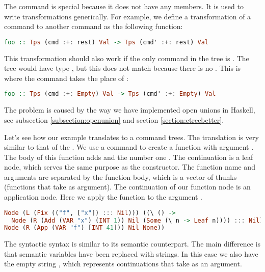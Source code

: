 The  command is special because it does not have any members. It is used to write transformations generically. For example, we define a transformation of a command to another command as the following function:

\begin{lstlisting}[language=Haskell]
foo :: Tps (cmd :+: rest) Val -> Tps (cmd' :+: rest) Val
\end{lstlisting}

This transformation should also work if the only command in the tree is . The tree would have type , but this does not match because there is no . This is where the  command takes the place of :

\begin{lstlisting}[language=Haskell]
foo :: Tps (cmd :+: Empty) Val -> Tps (cmd' :+: Empty) Val
\end{lstlisting}

The  problem is caused by the way we have implemented open unions in Haskell, see subsection \ref{subsection:openunion} and section \ref{section:ctreebetter}.

Let's see how our example  translates to a command trees. The translation is very similar to that of the . We use a  command to create a function  with argument . The body of this function adds  and the number one . The continuation is a leaf node, which serves the same purpose as the  constructor. The function name and arguments are separated by the function body, which is a vector of thunks (functions that take \icode{()} as argument). The continuation of our function node is an application node. Here we apply the function  to the argument .
  
\begin{lstlisting}[language=Haskell]
Node (L (Fix (("f", ["x"]) ::: Nil))) ((\ () ->
  Node (R (Add (VAR "x") (INT 1)) Nil (Some (\ n -> Leaf n)))) ::: Nil) (Some (\ () ->
Node (R (App (VAR "f") [INT 41])) Nil None))
\end{lstlisting}

The syntactic syntax is similar to its semantic counterpart. The main difference is that semantic variables have been replaced with strings. In this case we also have the empty string , which represents continuations that take \icode{()} as an argument.

